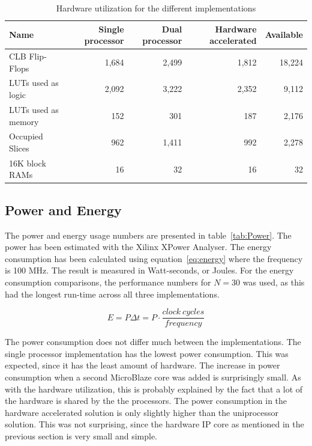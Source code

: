 \documentclass[11pt]{article}
\begin{document}
\begin{table}
  \centering
  \begin{tabular}{lrrrr}
    \toprule
    Name & Single processor & Dual processor & Hardware accelerated & Available \\
    \midrule
    CLB Flip-Flops & 1,684 & 2,499 & 1,812 & 18,224 \\ %
    LUTs used as logic & 2,092 & 3,222 & 2,352 & 9,112 \\
    LUTs used as memory & 152 & 301 & 187 & 2,176 \\ %
    Occupied Slices & 962 & 1,411 & 992 & 2,278 \\
    16K block RAMs & 16 & 32 & 16 & 32 \\
    \bottomrule
  \end{tabular}
  \caption{Hardware utilization for the different implementations}
  \label{tab:Utilization}
\end{table}

\subsection{Power and Energy}
The power and energy usage numbers are presented in table~\ref{tab:Power}. The power has been estimated with the Xilinx XPower Analyser. The energy consumption has been calculated using equation~\eqref{eq:energy} where the frequency is 100 MHz. The result is measured in Watt-seconds, or Joules. For the energy consumption comparisons, the performance numbers for $N=30$ was used, as this had the longest run-time across all three implementations.

\begin{equation}
  \label{eq:energy}
  E = P \Delta t = P \cdot \frac{clock\ cycles}{frequency}
\end{equation}

The power consumption does not differ much between the implementations. The single processor implementation has the lowest power consumption. This was expected, since it has the least amount of hardware. The increase in power consumption when a second MicroBlaze core was added is surprisingly small. As with the hardware utilization, this is probably explained by the fact that a lot of the hardware is shared by the the processors. The power consumption in the hardware accelerated solution is only slightly higher than the uniprocessor solution. This was not surprising, since the hardware IP core as mentioned in the previous section is very small and simple.
\end{document}
